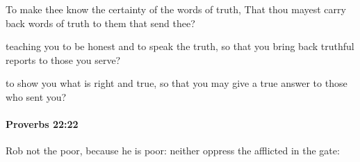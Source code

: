 			\begin{versebox}
					\item[BHS] 
					\item[ASV] To make thee know the certainty of the words of truth, That thou mayest carry back words of truth to them that send thee?
					\item[NIV] teaching you to be honest and to speak the truth, so that you bring back truthful reports to those you serve?
					\item[NRSV] to show you what is right and true, so that you may give a true answer to those who sent you?
			\end{versebox}

		\paragraph{Proverbs 22:22} %
			\label{PROVERBS-22-22}

			Rob not the poor, because he is poor: neither oppress the afflicted in the gate:

